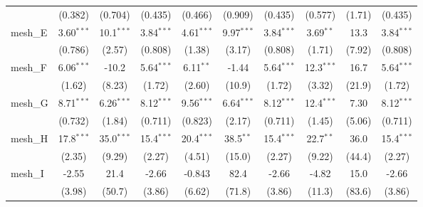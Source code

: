 \begin{tabular}{lccccccccc}
                                                               & (0.382)       & (0.704)        & (0.435)       & (0.466)       & (0.909)       & (0.435)       & (0.577)       & (1.71)         & (0.435)\\   
   mesh\_E                                                     & 3.60$^{***}$  & 10.1$^{***}$   & 3.84$^{***}$  & 4.61$^{***}$  & 9.97$^{***}$  & 3.84$^{***}$  & 3.69$^{**}$   & 13.3           & 3.84$^{***}$\\   
                                                               & (0.786)       & (2.57)         & (0.808)       & (1.38)        & (3.17)        & (0.808)       & (1.71)        & (7.92)         & (0.808)\\   
   mesh\_F                                                     & 6.06$^{***}$  & -10.2          & 5.64$^{***}$  & 6.11$^{**}$   & -1.44         & 5.64$^{***}$  & 12.3$^{***}$  & 16.7           & 5.64$^{***}$\\   
                                                               & (1.62)        & (8.23)         & (1.72)        & (2.60)        & (10.9)        & (1.72)        & (3.32)        & (21.9)         & (1.72)\\   
   mesh\_G                                                     & 8.71$^{***}$  & 6.26$^{***}$   & 8.12$^{***}$  & 9.56$^{***}$  & 6.64$^{***}$  & 8.12$^{***}$  & 12.4$^{***}$  & 7.30           & 8.12$^{***}$\\   
                                                               & (0.732)       & (1.84)         & (0.711)       & (0.823)       & (2.17)        & (0.711)       & (1.45)        & (5.06)         & (0.711)\\   
   mesh\_H                                                     & 17.8$^{***}$  & 35.0$^{***}$   & 15.4$^{***}$  & 20.4$^{***}$  & 38.5$^{**}$   & 15.4$^{***}$  & 22.7$^{**}$   & 36.0           & 15.4$^{***}$\\   
                                                               & (2.35)        & (9.29)         & (2.27)        & (4.51)        & (15.0)        & (2.27)        & (9.22)        & (44.4)         & (2.27)\\   
   mesh\_I                                                     & -2.55         & 21.4           & -2.66         & -0.843        & 82.4          & -2.66         & -4.82         & 15.0           & -2.66\\   
                                                               & (3.98)        & (50.7)         & (3.86)        & (6.62)        & (71.8)        & (3.86)        & (11.3)        & (83.6)         & (3.86)\\   

\end{tabular}
